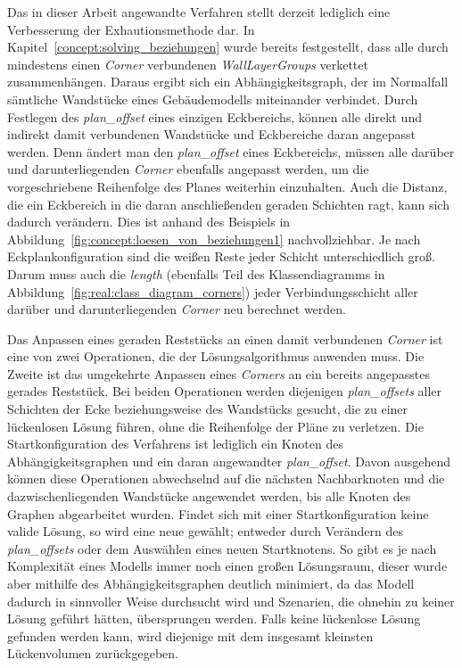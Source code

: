Das in dieser Arbeit angewandte Verfahren stellt derzeit lediglich eine Verbesserung der Exhautionsmethode dar.
In Kapitel~\ref{concept:solving_beziehungen} wurde bereits festgestellt, dass alle durch mindestens einen \textit{Corner} verbundenen \textit{WallLayerGroups} verkettet zusammenhängen.
Daraus ergibt sich ein Abhängigkeitsgraph, der im Normalfall sämtliche Wandstücke eines Gebäudemodells miteinander verbindet.
Durch Festlegen des \textit{plan\_offset} eines einzigen Eckbereichs, können alle direkt und indirekt damit verbundenen Wandstücke und Eckbereiche daran angepasst werden.
Denn ändert man den \textit{plan\_offset} eines Eckbereichs, müssen alle darüber und darunterliegenden \textit{Corner} ebenfalls angepasst werden, um die vorgeschriebene Reihenfolge des Planes weiterhin einzuhalten.
Auch die Distanz, die ein Eckbereich in die daran anschließenden geraden Schichten ragt, kann sich dadurch verändern.
Dies ist anhand des Beispiels in Abbildung~\ref{fig:concept:loesen_von_beziehungen1} nachvollziehbar.
Je nach Eckplankonfiguration sind die weißen Reste jeder Schicht unterschiedlich groß.
Darum muss auch die \textit{length} (ebenfalls Teil des Klassendiagramms in Abbildung~\ref{fig:real:class_diagram_corners}) jeder Verbindungsschicht aller darüber und darunterliegenden \textit{Corner} neu berechnet werden.

Das Anpassen eines geraden Reststücks an einen damit verbundenen \textit{Corner} ist eine von zwei Operationen, die der Lösungsalgorithmus anwenden muss.
Die Zweite ist das umgekehrte Anpassen eines \textit{Corners} an ein bereits angepasstes gerades Reststück.
Bei beiden Operationen werden diejenigen \textit{plan\_offsets} aller Schichten der Ecke beziehungsweise des Wandstücks gesucht, die zu einer lückenlosen Lösung führen, ohne die Reihenfolge der Pläne zu verletzen.
Die Startkonfiguration des Verfahrens ist lediglich ein Knoten des Abhängigkeitsgraphen und ein daran angewandter \textit{plan\_offset}.
Davon ausgehend können diese Operationen abwechselnd auf die nächsten Nachbarknoten und die dazwischenliegenden Wandstücke angewendet werden, bis alle Knoten des Graphen abgearbeitet wurden.
Findet sich mit einer Startkonfiguration keine valide Lösung, so wird eine neue gewählt; entweder durch Verändern des \textit{plan\_offsets} oder dem Auswählen eines neuen Startknotens.
So gibt es je nach Komplexität eines Modells immer noch einen großen Lösungsraum, dieser wurde aber mithilfe des Abhängigkeitsgraphen deutlich minimiert, da das Modell dadurch in sinnvoller Weise durchsucht wird und Szenarien, die ohnehin zu keiner Lösung geführt hätten, übersprungen werden.
Falls keine lückenlose Lösung gefunden werden kann, wird diejenige mit dem insgesamt kleinsten Lückenvolumen zurückgegeben.

